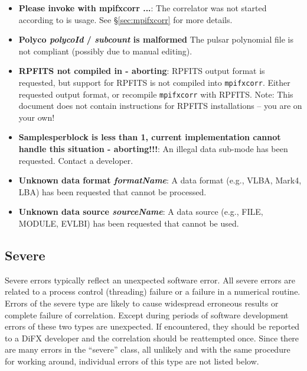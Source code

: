 \begin{itemize}
\item {\bf Please invoke with mpifxcorr ...}:
The correlator was not started according to is usage.
See \S\ref{sec:mpifxcorr} for more details.

\item {\bf Polyco {\it polycoId} / {\it subcount} is malformed}
The pulsar polynomial file is not compliant (possibly due to manual editing).

\item {\bf RPFITS not compiled in - aborting}:
RPFITS output format is requested, but support for RPFITS is not compiled into {\tt mpifxcorr}.
Either requested output format, or recompile {\tt mpifxcorr} with RPFITS.
Note: This document does not contain instructions for RPFITS installations -- you are on your own!

\item {\bf Samplesperblock is less than 1, current implementation cannot handle this situation - aborting!!!}:
An illegal data sub-mode has been requested.
Contact a developer.

\item {\bf Unknown data format {\it formatName}}:
A data format (e.g., VLBA, Mark4, LBA) has been requested that cannot be processed.

\item {\bf Unknown data source {\it sourceName}}:
A data source (e.g., FILE, MODULE, EVLBI) has been requested that cannot be used.

\end{itemize}





\subsection{Severe}

Severe errors typically reflect an unexpected software error.
All severe errors are related to a process control (threading) failure or a failure in a numerical routine.
Errors of the severe type are likely to cause widespread erroneous results or complete failure of correlation.
Except during periods of software development errors of these two types are unexpected.
If encountered, they should be reported to a DiFX developer and the correlation should be reattempted once.
Since there are many errors in the ``severe'' class, all unlikely and with the same procedure for working around, individual errors of this type are not listed below.





